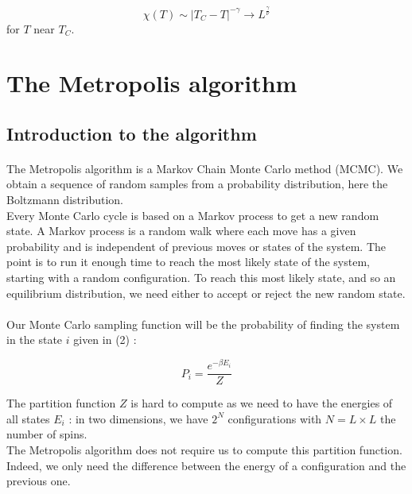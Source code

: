 \documentclass[a4paper, twoside, 11pt]{report}
\theoremstyle{theorem}
\theoremstyle{remark}
\theoremstyle{exemple}
\begin{document}
                \begin{equation*}
                    \chi(T) \sim |T_C - T|^{-\gamma} \rightarrow L^{\frac{\gamma}{\nu}}
                \end{equation*}
            for $T$ near $T_C$.
    
    
    \section{The Metropolis algorithm}
        
        \subsection{Introduction to the algorithm}
        
            \paragraph{}The Metropolis algorithm is a Markov Chain Monte Carlo method (MCMC). We obtain a sequence of random samples from a probability distribution, here the Boltzmann distribution.\\
            Every Monte Carlo cycle is based on a Markov process to get a new random state. A Markov process is a random walk where each move has a given probability and is independent of previous moves or states of the system. The point is to run it enough time to reach the most likely state of the system, starting with a random configuration. To reach this most likely state, and so an equilibrium distribution, we need either to accept or reject the new random state. 
            
            \paragraph{}Our Monte Carlo sampling function will be the probability of finding the system in the state $i$ given in (2) :
                    
                \begin{equation*}
                    P_i = \frac{e^{-\beta E_i}}{Z}
                \end{equation*}
                
            The partition function $Z$ is hard to compute as we need to have the energies of all states $E_i$ : in two dimensions, we have $2^N$ configurations with $N=L\times L$ the number of spins. \\
            The Metropolis algorithm does not require us to compute this partition function. Indeed, we only need the difference between the energy of a configuration and the previous one.
            
\end{document}
